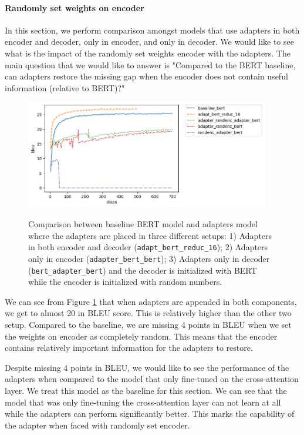 \paragraph{Randomly set weights on encoder}
In this section, we perform comparison amongst models that use adapters in both encoder and decoder, only in encoder, and only in decoder. We would like to see what is the impact of the randomly set weights encoder with the adapters. The main question that we would like to answer is "Compared to the BERT baseline, can adapters restore the missing gap when the encoder does not contain useful information (relative to BERT)?"

\begin{figure}[h]
    {\includegraphics[width=0.95\textwidth]{img/adapter_bert_randenc.png}}
    \centering
    \caption{Comparison between baseline BERT model and adapters model where the adapters are placed in three different setups: 1) Adapters in both encoder and decoder (\texttt{adapt\_bert\_reduc\_16}); 2) Adapters only in encoder (\texttt{adapter\_bert\_bert}); 3) Adapters only in decoder (\texttt{bert\_adapter\_bert}) and the decoder is initialized with BERT while the encoder is initialized with random numbers.}
    \label{img:adapt_bert_randenc}
\end{figure}

We can see from Figure \ref{img:adapt_bert_randenc} that when adapters are appended in both components, we get to almost 20 in BLEU score. This is relatively higher than the other two setup. Compared to the baseline, we are missing 4 points in BLEU when we set the weights on encoder as completely random. This means that the encoder contains relatively important information for the adapters to restore.

Despite missing 4 points in BLEU, we would like to see the performance of the adapters when compared to the model that only fine-tuned on the cross-attention layer. We treat this model as the baseline for this section. We can see that the model that was only fine-tuning the cross-attention layer can not learn at all while the adapters can perform significantly better. This marks the capability of the adapter when faced with randomly set encoder.

